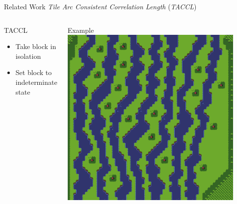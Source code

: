 \documentclass{beamer}
\begin{document}
  \begin{frame}[fragile]{Related Work}
    \textit{Tile Arc Consistent Correlation Length} (\textit{TACCL})
    \begin{columns}[T,onlytextwidth]
        \begin{block}{TACCL}
          \hfill \\
          \begin{itemize}
            \item Take block in isolation
            \item Set block to indeterminate state
          \end{itemize}
        \end{block}
        \begin{block}{Example}
          \includegraphics[width=0.9\textwidth]{img/forestmicro_64x64.pdf}
        \end{block}
    \end{columns}
  \end{frame}
\end{document}
